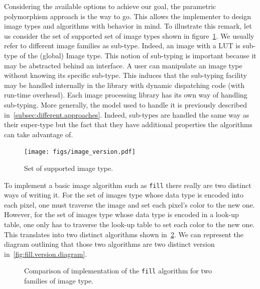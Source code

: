 Considering the available options to achieve our goal, the parametric polymorphism approach is the way to go. This
allows the implementer to design image types and algorithms with behavior in mind. To illustrate this remark, let us
consider the set of supported set of image types shown in figure~\ref{fig:image.version}. We usually refer to different
image families as sub-type. Indeed, an image with a LUT is sub-type of the (global) Image type. This notion of
sub-typing is important because it may be abstracted behind an interface. A user can manipulate an image type without
knowing its specific sub-type. This induces that the sub-typing facility may be handled internally in the library with
dynamic dispatching code (with run-time overhead). Each image processing library has its own way of handling sub-typing.
More generally, the model used to handle it is previously described in~\cref{subsec:different.approaches}. Indeed,
sub-types are handled the same way as their super-type but the fact that they have additional properties the algorithms
can take advantage of.

\begin{figure}[tbh]
  \centering
  \texttt{[image: figs/image\_version.pdf]}
  \caption{Set of supported image type.}
  \label{fig:image.version}
\end{figure}

To implement a basic image algorithm such as \texttt{fill} there really are two distinct ways of writing it. For the
set of images type whose data type is encoded into each pixel, one must traverse the image and set each pixel's color
to the new one. However, for the set of images type whose data type is encoded in a look-up table, one only has to
traverse the look-up table to set each color to the new one. This translates into two distinct algorithms shown
in~\cref{fig:traverse.vs.LUT}. We can represent the diagram outlining that those two algorithms are two distinct version
in~\cref{fig:fill.version.diagram}.

\begin{figure}[tbh]
  \centering
  \hfil

  \caption{Comparison of implementation of the \texttt{fill} algorithm for two
    families of image type.}
  \label{fig:traverse.vs.LUT}
\end{figure}

